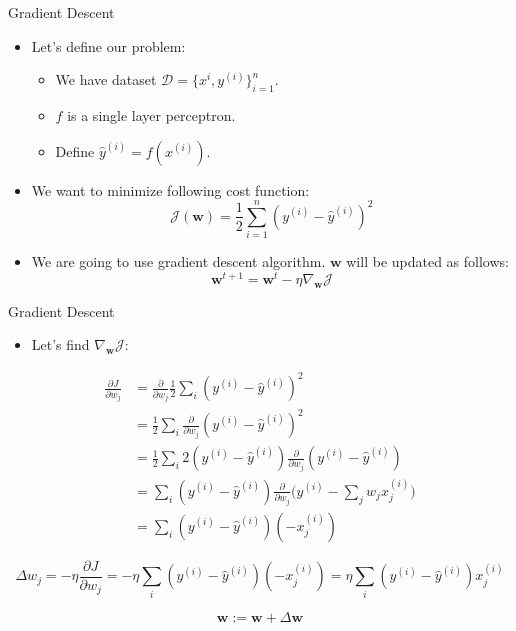 \begin{frame}{Gradient Descent}
	\begin{itemize}
		\item Let's define our problem:
		\begin{itemize}
			\item We have dataset $\mathcal{D} = \{x^{i}, y^{(i)}\}_{i=1}^{n}$.
			\medskip
			\item $f$ is a single layer perceptron.
			\medskip
			\item Define $\hat{y}^{(i)} = f(x^{(i)})$.
		\end{itemize}
		\medskip
		\item We want to minimize following cost function:
		$$
		\mathcal{J}(\bm{w})  = \frac{1}{2} \sum_{i=1}^{n} (y^{(i)} - \hat{y}^{(i)})^2
		$$
		\medskip
		\item We are going to use gradient descent algorithm. $\bm{w}$ will be updated as follows:
		\[
		\bm{w}^{t+1} = \bm{w}^{t} - \eta \nabla_{\bm{w}} \mathcal{J}
		\]
	\end{itemize}
\end{frame}

\begin{frame}{Gradient Descent}
	\begin{itemize}
		\item Let's find $\nabla_{\bm{w}} \mathcal{J}$:
	\end{itemize}
	\vspace*{0.5em}
	\begin{equation*} 
		\begin{split}
			\frac{\partial J}{\partial w_j} & = \frac{\partial }{\partial w_j} \frac{1}{2} \sum_i  (y^{(i)} - \hat{y}^{(i)})^2 \\
			& = \frac{1}{2} \sum_i \frac{\partial}{\partial w_j} (y^{(i)} - \hat{y}^{(i)})^2 \\
			& = \frac{1}{2} \sum_i 2 (y^{(i)} - \hat{y}^{(i)}) \frac{\partial}{\partial w_j} (y^{(i)} - \hat{y}^{(i)}) \\ 
			& = \sum_i (y^{(i)} - \hat{y}^{(i)}) \frac{\partial}{\partial w_j} \bigg(y^{(i)} - \sum_j w_j x^{(i)}_{j}\bigg) \\
			& = \sum_i  (y^{(i)} - \hat{y}^{(i)})(-x^{(i)}_{j}) 
		\end{split}
	\end{equation*}
	
	$$\Delta w_j = - \eta \frac{\partial J}{\partial w_j} = - \eta \sum_i  (y^{(i)} - \hat{y}^{(i)})(- x^{(i)}_{j}) = \eta \sum_i (y^{(i)} - \hat{y}^{(i)})x^{(i)}_{j}$$
	
	$$\mathbf{w} := \mathbf{w} + \Delta \mathbf{w}$$
\end{frame}